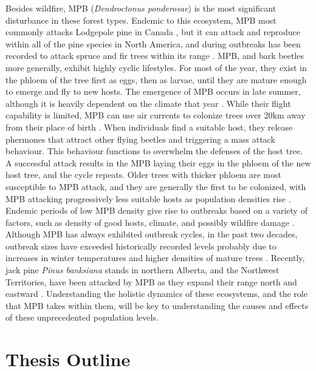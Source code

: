 Besides wildfire, MPB (\textit{Dendroctonus ponderosae}) is the most significant disturbance in these forest types. Endemic to this ecosystem, MPB most commonly attacks Lodgepole pine in Canada \cite{safranyik2007mountain}, but it can attack and reproduce within all of the pine species in North America, and during outbreaks has been recorded to attack spruce and fir trees within its range \cite{gibson2009mountain}. MPB, and bark beetles more generally, exhibit highly cyclic lifestyles. For most of the year, they exist in the phloem of the tree first as eggs, then as larvae, until they are mature enough to emerge and fly to new hosts. The emergence of MPB occurs in late summer, although it is heavily dependent on the climate that year \cite{bentz2014mountain}. While their flight capability is limited, MPB can use air currents to colonize trees over 20km away from their place of birth \cite{shegelski2019morphological}. When individuals find a suitable host, they release phermones that attract other flying beetles and triggering a mass attack behaviour. This behaviour functions to overwhelm the defenses of the host tree. A successful attack results in the MPB laying their eggs in the phloem of the new host tree, and the cycle repeats. Older trees with thicker phloem are most susceptible to MPB attack, and they are generally the first to be colonized, with MPB attacking progressively less suitable hosts as population densities rise \cite{safranyik2007mountain}. Endemic periods of low MPB density give rise to outbreaks based on a variety of factors, such as density of good hosts, climate, and possibly wildfire damage \cite{safranyik2007mountain}. Although MPB has always exhibited outbreak cycles, in the past two decades, outbreak sizes have exceeded historically recorded levels probably due to increases in winter temperatures and higher densities of mature trees \cite{bentz2010climate,safranyik2007mountain}. Recently, jack pine \textit{Pinus banksiana} stands in northern Alberta, and the Northwest Territories, have been attacked by MPB as they expand their range north and eastward \cite{cudmore2010climate,nrcanmpb}. Understanding the holistic dynamics of these ecosystems, and the role that MPB takes within them, will be key to understanding the causes and effects of these unprecedented population levels. 

\section{Thesis Outline}

